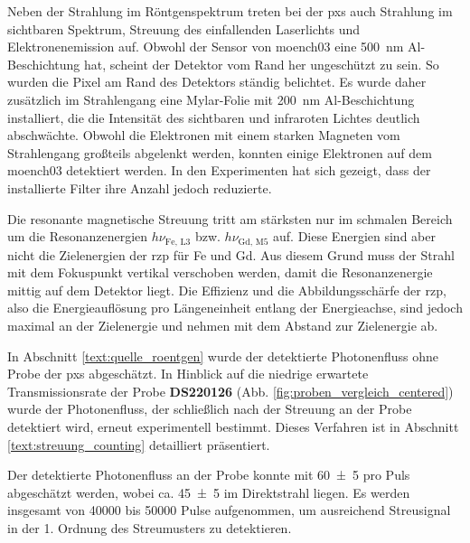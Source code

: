\noindent
Neben der Strahlung im Röntgenspektrum treten bei der \gls{pxs} auch Strahlung im sichtbaren Spektrum, Streuung des einfallenden Laserlichts und Elektronenemission auf. Obwohl der Sensor von \gls{moench03} eine \SI{500}{\nano\meter} Al-Beschichtung hat, scheint der Detektor vom Rand her ungeschützt zu sein. So wurden die Pixel am Rand des Detektors ständig belichtet. Es wurde daher zusätzlich im Strahlengang eine Mylar-Folie mit \SI{200}{\nano\meter} Al-Beschichtung installiert, die die Intensität des sichtbaren und infraroten Lichtes deutlich abschwächte. Obwohl die Elektronen mit einem starken Magneten vom Strahlengang großteils abgelenkt werden, konnten einige Elektronen auf dem \gls{moench03} detektiert werden. In den Experimenten hat sich gezeigt, dass der installierte Filter ihre Anzahl jedoch reduzierte.
%

\noindent
Die resonante magnetische Streuung tritt am stärksten nur im schmalen Bereich um die Resonanzenergien $h\nu_{\text{Fe, L3}}$ bzw. $h\nu_{\text{Gd, M5}}$ auf. Diese Energien sind aber nicht die Zielenergien der \gls{rzp} für Fe und Gd. Aus diesem Grund muss der Strahl mit dem Fokuspunkt vertikal verschoben werden, damit die Resonanzenergie mittig auf dem Detektor liegt. Die Effizienz und die Abbildungsschärfe der \gls{rzp}, also die Energieauflösung pro Längeneinheit entlang der Energieachse, sind jedoch maximal an der Zielenergie und nehmen mit dem Abstand zur Zielenergie ab.

\noindent
In Abschnitt \ref{text:quelle_roentgen} wurde der detektierte Photonenfluss ohne Probe der \gls{pxs} abgeschätzt. In Hinblick auf die niedrige erwartete Transmissionsrate der Probe \textbf{DS220126} (Abb. \ref{fig:proben_vergleich_centered}) wurde der Photonenfluss, der schließlich nach der Streuung an der Probe detektiert wird, erneut experimentell bestimmt. Dieses Verfahren ist in Abschnitt \ref{text:streuung_counting} detailliert präsentiert.

\noindent
Der detektierte Photonenfluss an der Probe konnte mit \SI{60(5)}{\photons} pro Puls abgeschätzt werden, wobei ca. \SI{45(5)}{\photons} im Direktstrahl liegen. Es werden insgesamt von \num{40000} bis \SI{50000}{\captures} Pulse aufgenommen, um ausreichend Streusignal in der 1. Ordnung des Streumusters zu detektieren.


